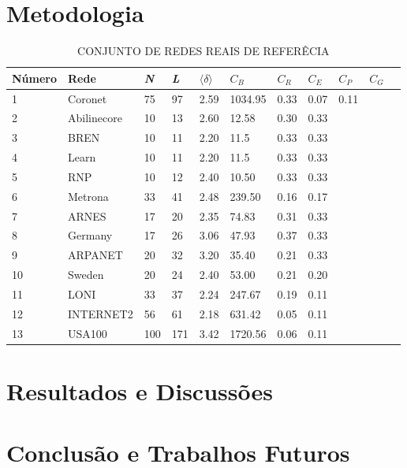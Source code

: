 \documentclass[12pt]{article}
\begin{document}
\section{Metodologia}
\begin{table}[htp]
\caption{CONJUNTO DE REDES REAIS DE REFERÊCIA}\label{tab:tab1}
\centering
\begin{tabular}{l*{9}{l}r}
\hline\rowcolor{Gray}
Número & Rede & \textit{N} & \textit{L} & $\langle \delta \rangle$ & $C_B$ & $C_R$ & $C_E$ & $C_P$ & $C_G$\\ 
\hline
1 & Coronet & 75 & 97 & 2.59& 1034.95& 0.33& 0.07 & 0.11\\ 
2 &  Abilinecore &  10 &  13& 2.60& 12.58 & 0.30 & 0.33\\
3 &  BREN &  10 &  11& 2.20& 11.5 & 0.33 & 0.33\\
4 &  Learn &  10 &  11& 2.20& 11.5& 0.33 & 0.33\\
5 &  RNP &  10 &  12& 2.40& 10.50&  0.33 & 0.33\\
6 &  Metrona &  33 &  41& 2.48& 239.50&  0.16 & 0.17\\
7 &  ARNES &  17 &  20& 2.35& 74.83&  0.31 & 0.33\\
8 &  Germany &  17 &  26& 3.06& 47.93& 0.37 & 0.33\\
9 &  ARPANET &  20 &  32& 3.20& 35.40&  0.21 & 0.33\\
10 &  Sweden &  20 &  24& 2.40& 53.00& 0.21 & 0.20\\
11 &  LONI &  33 &  37& 2.24& 247.67&  0.19 & 0.11\\
12 &  INTERNET2 &  56&  61& 2.18& 631.42&  0.05 & 0.11\\
13 &  USA100 &  100 &  171& 3.42& 1720.56&  0.06 & 0.11
\end{tabular}
\hline
\end{table}
\section{Resultados e Discussões}


\section{Conclusão e Trabalhos Futuros}



\end{document}
